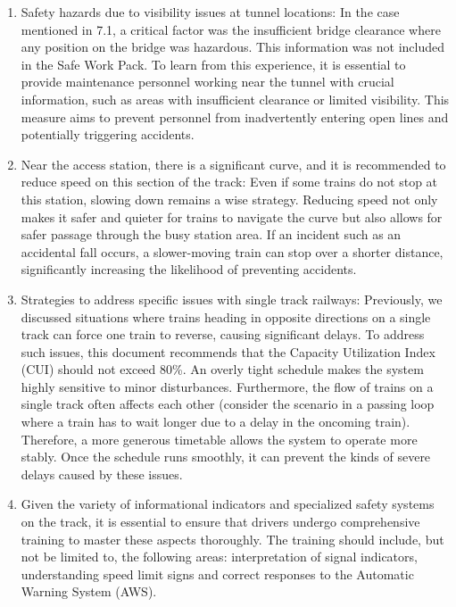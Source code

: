 \documentclass[letterpaper,12pt,leqno]{article}
\begin{document}
\begin{enumerate}
    \item Safety hazards due to visibility issues at tunnel locations: In the case mentioned in 7.1, a critical factor was the insufficient bridge clearance where any position on the bridge was hazardous. This information was not included in the Safe Work Pack. To learn from this experience, it is essential to provide maintenance personnel working near the tunnel with crucial information, such as areas with insufficient clearance or limited visibility. This measure aims to prevent personnel from inadvertently entering open lines and potentially triggering accidents.
    \item Near the access station, there is a significant curve, and it is recommended to reduce speed on this section of the track: Even if some trains do not stop at this station, slowing down remains a wise strategy. Reducing speed not only makes it safer and quieter for trains to navigate the curve but also allows for safer passage through the busy station area. If an incident such as an accidental fall occurs, a slower-moving train can stop over a shorter distance, significantly increasing the likelihood of preventing accidents.
    \item Strategies to address specific issues with single track railways: Previously, we discussed situations where trains heading in opposite directions on a single track can force one train to reverse, causing significant delays. To address such issues, this document recommends that the Capacity Utilization Index (CUI) should not exceed 80\%. An overly tight schedule makes the system highly sensitive to minor disturbances. Furthermore, the flow of trains on a single track often affects each other (consider the scenario in a passing loop where a train has to wait longer due to a delay in the oncoming train). Therefore, a more generous timetable allows the system to operate more stably. Once the schedule runs smoothly, it can prevent the kinds of severe delays caused by these issues.
    \item Given the variety of informational indicators and specialized safety systems on the track, it is essential to ensure that drivers undergo comprehensive training to master these aspects thoroughly. The training should include, but not be limited to, the following areas:
    interpretation of signal indicators, understanding speed limit signs and correct responses to the Automatic Warning System (AWS).
    
\end{enumerate}

\newpage



	
\end{document}
